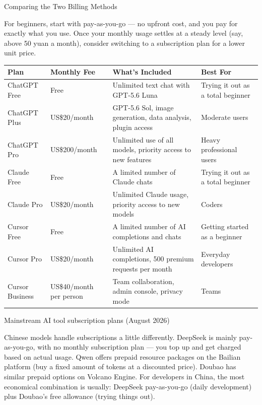 \begin{center}\small\color{gray}Comparing the Two Billing Methods\end{center}

For beginners, start with pay-as-you-go — no upfront cost, and you pay for exactly what you use. Once your monthly usage settles at a steady level (say, above 50 yuan a month), consider switching to a subscription plan for a lower unit price.


\begin{center}
\begin{tabularx}{\linewidth}{|X|X|X|X|}
\hline
\textbf{Plan} & \textbf{Monthly Fee} & \textbf{What's Included} & \textbf{Best For} \tabularnewline
\hline
ChatGPT Free & Free & Unlimited text chat with GPT-5.6 Luna & Trying it out as a total beginner \tabularnewline
ChatGPT Plus & US\$20/month & GPT-5.6 Sol, image generation, data analysis, plugin access & Moderate users \tabularnewline
ChatGPT Pro & US\$200/month & Unlimited use of all models, priority access to new features & Heavy professional users \tabularnewline
Claude Free & Free & A limited number of Claude chats & Trying it out as a total beginner \tabularnewline
Claude Pro & US\$20/month & Unlimited Claude usage, priority access to new models & Coders \tabularnewline
Cursor Free & Free & A limited number of AI completions and chats & Getting started as a beginner \tabularnewline
Cursor Pro & US\$20/month & Unlimited AI completions, 500 premium requests per month & Everyday developers \tabularnewline
Cursor Business & US\$40/month per person & Team collaboration, admin console, privacy mode & Teams \tabularnewline
\hline
\end{tabularx}
\end{center}

\begin{center}\small\color{gray}Mainstream AI tool subscription plans (August 2026)\end{center}

Chinese models handle subscriptions a little differently. DeepSeek is mainly pay-as-you-go, with no monthly subscription plan — you top up and get charged based on actual usage. Qwen offers prepaid resource packages on the Bailian platform (buy a fixed amount of tokens at a discounted price). Doubao has similar prepaid options on Volcano Engine. For developers in China, the most economical combination is usually: DeepSeek pay-as-you-go (daily development) plus Doubao's free allowance (trying things out).

